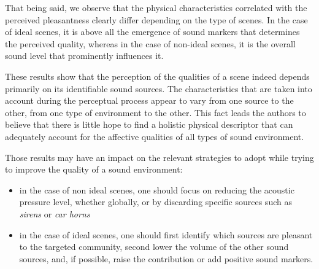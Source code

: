 \documentclass[12pt]{elsarticle}
\newcommand{\ie}{\emph{i.\,e.}}
\begin{document}
That being said, we observe that the physical characteristics correlated with the perceived pleasantness clearly differ depending on the type of scenes. In the case of ideal scenes, it is above all the emergence of sound markers that determines the perceived quality, whereas in the case of non-ideal scenes, it is the overall sound level that prominently influences it.


These results show that the perception of the qualities of a scene indeed depends primarily on its identifiable sound sources. The characteristics that are taken into account during the perceptual process appear to vary from one source to the other, from one type of environment to the other. This fact leads the authors to believe that there is little hope to find a holistic physical descriptor that can adequately account for the affective qualities of all types of sound environment.


Those results may have an impact on the relevant strategies to adopt while trying to improve the quality of a sound environment:


\begin{itemize}
\item in the case of non ideal scenes, one should focus on reducing the acoustic pressure level, whether globally, or by discarding specific sources such as \emph{sirens} or \emph{car horns}
\item in the case of ideal scenes, one should first identify which sources are pleasant to the targeted community, second lower the volume of the other sound sources, and, if possible, raise the contribution or add positive sound markers.
\end{itemize}
\end{document}
